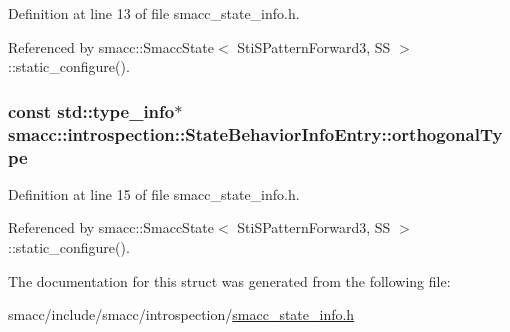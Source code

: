 Definition at line 13 of file smacc\+\_\+state\+\_\+info.\+h.



Referenced by smacc\+::\+Smacc\+State$<$ Sti\+S\+Pattern\+Forward3, S\+S $>$\+::static\+\_\+configure().

\subsubsection[{\texorpdfstring{orthogonal\+Type}{orthogonalType}}]{\setlength{\rightskip}{0pt plus 5cm}const std\+::type\+\_\+info$\ast$ smacc\+::introspection\+::\+State\+Behavior\+Info\+Entry\+::orthogonal\+Type}\hypertarget{structsmacc_1_1introspection_1_1StateBehaviorInfoEntry_aafb02bbfd8a479d586039b3971dfe7e0}{}\label{structsmacc_1_1introspection_1_1StateBehaviorInfoEntry_aafb02bbfd8a479d586039b3971dfe7e0}


Definition at line 15 of file smacc\+\_\+state\+\_\+info.\+h.



Referenced by smacc\+::\+Smacc\+State$<$ Sti\+S\+Pattern\+Forward3, S\+S $>$\+::static\+\_\+configure().



The documentation for this struct was generated from the following file\+:\begin{DoxyCompactItemize}
\item 
smacc/include/smacc/introspection/\hyperlink{smacc__state__info_8h}{smacc\+\_\+state\+\_\+info.\+h}\end{DoxyCompactItemize}
